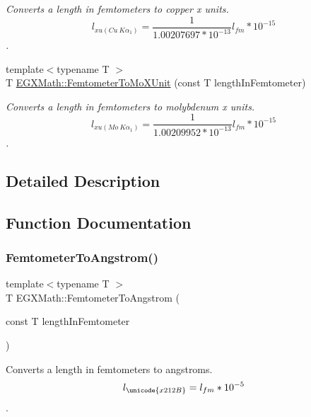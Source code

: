 \begin{DoxyCompactItemize}
\begin{DoxyCompactList}\small\item\em Converts a length in femtometers to copper x units. \[ l_{xu(Cu\ K\alpha_1)}= \frac{1}{1.00207697*10^{-13}} l_{fm} * 10^{-15}\]. \end{DoxyCompactList}\item 
{\footnotesize template$<$typename T $>$ }\\T \mbox{\hyperlink{group___e_g_x_math-_conversions-_length_conversions-_femtometer-_non-_s_i_ga57801d7c681362c1a11053233e31c415}{E\+G\+X\+Math\+::\+Femtometer\+To\+Mo\+X\+Unit}} (const T length\+In\+Femtometer)
\begin{DoxyCompactList}\small\item\em Converts a length in femtometers to molybdenum x units. \[ l_{xu(Mo\ K\alpha_1)}=\frac{1}{1.00209952*10^{-13}} l_{fm} * 10^{-15}\]. \end{DoxyCompactList}\end{DoxyCompactItemize}


\subsection{Detailed Description}


\subsection{Function Documentation}
\mbox{\label{group___e_g_x_math-_conversions-_length_conversions-_femtometer-_non-_s_i_ga72862654ebe3812db0fbf8d11d7059ff}} 
\subsubsection{\texorpdfstring{Femtometer\+To\+Angstrom()}{FemtometerToAngstrom()}}
{\footnotesize\ttfamily template$<$typename T $>$ \\
T E\+G\+X\+Math\+::\+Femtometer\+To\+Angstrom (\begin{DoxyParamCaption}\item[{const T}]{length\+In\+Femtometer }\end{DoxyParamCaption})}



Converts a length in femtometers to angstroms. \[ l_{\unicode{x212B}}=l_{fm} * 10^{-5} \]. 

